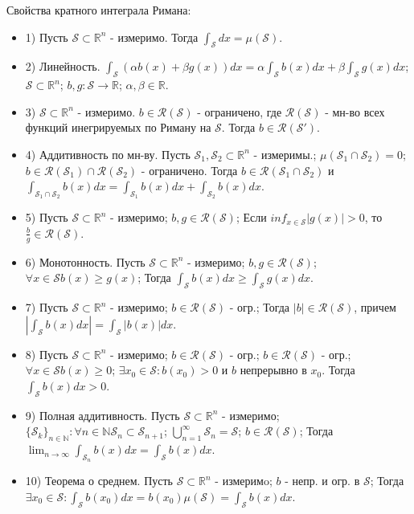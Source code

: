 \documentclass[unicode,10pt, landscape]{article}
\begin{document}
\begin{multicols}{4}
Свойства кратного интеграла Римана:
\begin{itemize}
\item 1) Пусть $\mathcal{S} \subset \mathbb{R}^n$ - измеримо. Тогда $\int_{\mathcal{S}}dx = \mu(\mathcal{S})$.
\item 2) Линейность. $\int_{\mathcal{S}}(\alpha b(x) + \beta g(x))dx = \alpha\int_\mathcal{S}b(x)dx + \beta\int_\mathcal{S}g(x)dx$; $\mathcal{S} \subset \mathbb{R}^n$; $b,g: \mathcal{S} \to \mathbb{R}$; $\alpha, \beta \in \mathbb{R}$.
\item 3) $\mathcal{S} \subset \mathbb{R}^n$ - измеримо. $b \in \mathcal{R}(\mathcal{S})$ - ограничено, где $\mathcal{R}(\mathcal{S})$ - мн-во всех функций инегрируемых по Риману на $\mathcal{S}$. Тогда $b \in \mathcal{R}(\mathcal{S}')$.
\item 4) Аддитивность по мн-ву. Пусть $\mathcal{S}_1, \mathcal{S}_2 \subset \mathbb{R}^n$ - измеримы.; $\mu(\mathcal{S}_1 \cap \mathcal{S}_2) = 0$; $b \in \mathcal{R}(\mathcal{S}_1) \cap \mathcal{R}(\mathcal{S}_2)$ - ограничено. Тогда $b \in \mathcal{R}(\mathcal{S}_1 \cap \mathcal{S}_2)$ и $\int_{\mathcal{S}_1 \cap \mathcal{S}_2}b(x)dx = \int_{\mathcal{S}_1}b(x)dx + \int_{\mathcal{S}_2}b(x)dx$.
\item 5) Пусть $\mathcal{S} \subset \mathbb{R}^n$ - измеримо; $b, g \in \mathcal{R}(\mathcal{S})$; Если $inf_{x \in \mathcal{S}} |g(x)| > 0$, то $\frac{b}{g} \in \mathcal{R}(\mathcal{S})$.
\item 6) Монотонность. Пусть $\mathcal{S} \subset \mathbb{R}^n$ - измеримо; $b, g \in \mathcal{R}(\mathcal{S})$; $\forall x \in \mathcal{S}  b(x) \geq g(x)$; Тогда $\int_\mathcal{S}b(x)dx \geq \int_\mathcal{S}g(x)dx$.
\item 7) Пусть $\mathcal{S} \subset \mathbb{R}^n$ - измеримо; $b \in \mathcal{R}(\mathcal{S})$ - огр.; Тогда $|b| \in \mathcal{R}(\mathcal{S})$, причем $|\int_\mathcal{S}b(x)dx| = \int_\mathcal{S}|b(x)|dx$.
\item 8)  Пусть $\mathcal{S} \subset \mathbb{R}^n$ - измеримо; $b \in \mathcal{R}(\mathcal{S})$ - огр.; $b \in \mathcal{R}(\mathcal{S})$ - огр.; $\forall x \in \mathcal{S}  b(x) \geq 0$; $\exists x_0 \in \mathcal{S}: b(x_0) > 0$ и $b$ непрерывно в $x_0$. Тогда $\int_\mathcal{S}b(x)dx > 0$.
\item 9) Полная аддитивность.  Пусть $\mathcal{S} \subset \mathbb{R}^n$ - измеримо; $\{\mathcal{S}_k\}_{n\in\mathbb{N}} : \forall n \in \mathbb{N} \mathcal{S}_n \subset \mathcal{S}_{n+1}$; $\bigcup_{n=1}^\infty \mathcal{S}_n = \mathcal{S}$; $b \in \mathcal{R}(\mathcal{S})$; Тогда $\lim_{n \to \infty} \int_{\mathcal{S}_n} b(x)dx = \int_{\mathcal{S}} b(x)dx$.
\item 10) Теорема о среднем.  Пусть $\mathcal{S} \subset \mathbb{R}^n$ - измеримo; $b$ - непр. и огр. в $\mathcal{S}$; Тогда $\exists x_0 \in \mathcal{S}: \int_\mathcal{S} b(x_0)dx = b(x_0)\mu(\mathcal{S}) = \int_{\mathcal{S}} b(x)dx$.
\end{itemize}


\end{multicols}
\end{document}
